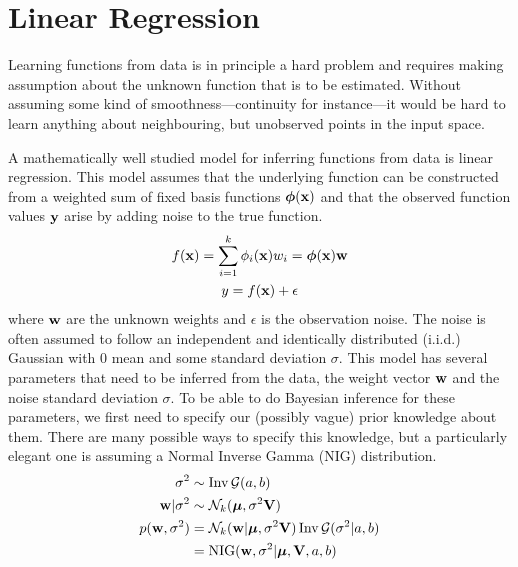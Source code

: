 \documentclass[../thesis.tex]{subfiles}
\begin{document}
\section{Linear Regression}
Learning functions from data is in principle a hard problem and requires making assumption about the unknown function that is to be estimated. Without assuming some kind of smoothness---continuity for instance---it would be hard to learn anything about neighbouring, but unobserved points in the input space.

A mathematically well studied model for inferring functions from data is linear regression. This model assumes that the underlying function can be constructed from a weighted sum of fixed basis functions $\boldsymbol{\mathbf{\phi}}(\boldsymbol{\mathbf{x}})$ and that the observed function values $\boldsymbol{\mathbf{y}}$ arise by adding noise to the true function.
\begin{gather}
        f(\boldsymbol{\mathbf{x}}) = \sum_{i=1}^k \phi_i(\boldsymbol{\mathbf{x}}) w_i = \boldsymbol{\mathbf{\phi}}(\boldsymbol{\mathbf{x}}) \boldsymbol{\mathbf{w}} \\
        y = f(\boldsymbol{\mathbf{x}}) + \epsilon
\end{gather}
where $\boldsymbol{\mathbf{w}}$ are the unknown weights and $\epsilon$ is the observation noise. The noise is often assumed to follow an independent and identically distributed (i.i.d.) Gaussian with $0$ mean and some standard deviation $\sigma$. This model has several parameters that need to be inferred from the data, the weight vector $\boldsymbol{\mathbf{w}}$ and the noise standard deviation $\sigma$. To be able to do Bayesian inference for these parameters, we first need to specify our (possibly vague) prior knowledge about them. There are many possible ways to specify this knowledge, but a particularly elegant one is assuming a Normal Inverse Gamma (NIG) distribution. 
\begin{equation}
    \begin{split}
        \sigma^2 &\sim \operatorname{Inv}\mathcal{G}(a, b) \\  
        \boldsymbol{\mathbf{w}} | \sigma^2 &\sim \mathcal{N}_k(\boldsymbol{\mathbf{\mu}}, \sigma^2 \boldsymbol{\mathbf{V}}) \\
        p(\boldsymbol{\mathbf{w}}, \sigma^2) &= \mathcal{N}_k(\boldsymbol{\mathbf{w}} | \boldsymbol{\mathbf{\mu}}, \sigma^2 \boldsymbol{\mathbf{V}})  \operatorname{Inv}\mathcal{G}(\sigma^2 | a, b) \\
        &= \operatorname{NIG}(\boldsymbol{\mathbf{w}}, \sigma^2 | \boldsymbol{\mathbf{\mu}}, \boldsymbol{\mathbf{V}}, a, b) \\
    \end{split}
\end{equation}
\end{document}
